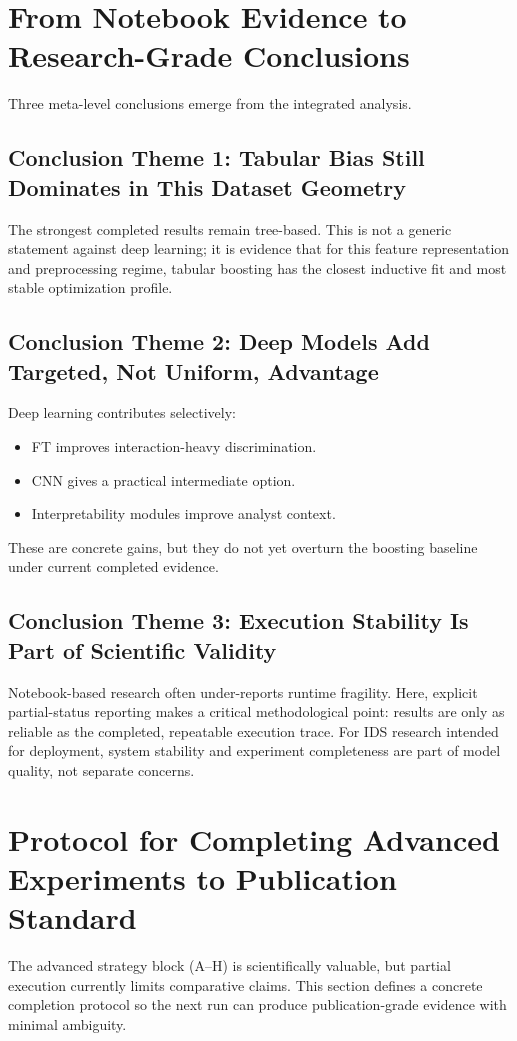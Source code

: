 \documentclass[10pt,journal]{IEEEtran}
\begin{document}
\section{From Notebook Evidence to Research-Grade Conclusions}
Three meta-level conclusions emerge from the integrated analysis.

\subsection{Conclusion Theme 1: Tabular Bias Still Dominates in This Dataset Geometry}
The strongest completed results remain tree-based. This is not a generic statement against deep learning; it is evidence that for this feature representation and preprocessing regime, tabular boosting has the closest inductive fit and most stable optimization profile.

\subsection{Conclusion Theme 2: Deep Models Add Targeted, Not Uniform, Advantage}
Deep learning contributes selectively:
\begin{itemize}
\item FT improves interaction-heavy discrimination.
\item CNN gives a practical intermediate option.
\item Interpretability modules improve analyst context.
\end{itemize}
These are concrete gains, but they do not yet overturn the boosting baseline under current completed evidence.

\subsection{Conclusion Theme 3: Execution Stability Is Part of Scientific Validity}
Notebook-based research often under-reports runtime fragility. Here, explicit partial-status reporting makes a critical methodological point: results are only as reliable as the completed, repeatable execution trace. For IDS research intended for deployment, system stability and experiment completeness are part of model quality, not separate concerns.

\section{Protocol for Completing Advanced Experiments to Publication Standard}
The advanced strategy block (A--H) is scientifically valuable, but partial execution currently limits comparative claims. This section defines a concrete completion protocol so the next run can produce publication-grade evidence with minimal ambiguity.
\end{document}
